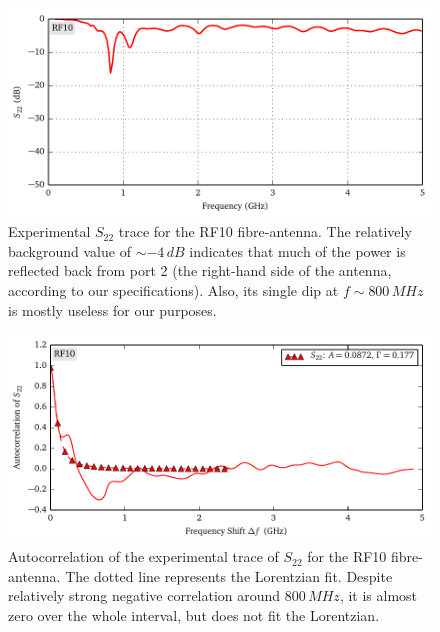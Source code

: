\begin{figure}[h]
 \centering
 \includegraphics{figs/active/RF10-sParameters.pdf}
 \caption[Experimental $S_{22}$ trace of the RF10 fibre-antenna]
 		{Experimental $S_{22}$ trace for the RF10 fibre-antenna. 
 		The relatively background value of $\sim -4\,\unit{dB}$ indicates
 		that much of the power is reflected back from port 2 (the right-hand side of
 		the antenna, according to our specifications). Also, its single dip at $f\sim800\,\unit{MHz}$
 		is mostly useless for our purposes.}
 \label{fig:active.lcx.rf10sParameters}
\end{figure}

\begin{figure}[h]
 \centering
 \includegraphics{figs/active/RF10-autoCorrelation.pdf}
 \caption[Autocorrelation of the experimental trace of $S_{22}$ for the RF10 fibre-antenna]
 		{Autocorrelation of the experimental trace of $S_{22}$ for the RF10 fibre-antenna.
 		The dotted line represents the Lorentzian fit. Despite relatively strong negative correlation around $800\,\unit{MHz}$,
 		it is almost zero over the whole interval, but does not fit the Lorentzian.}
 \label{fig:active.lcx.rf10autocorrelation}
\end{figure}

